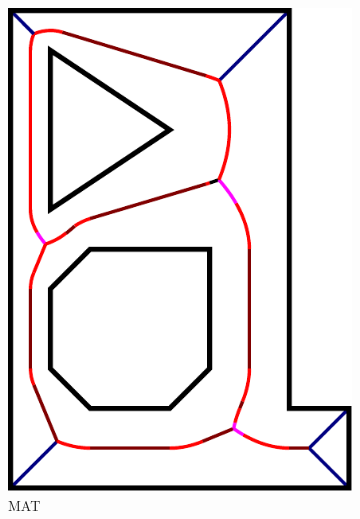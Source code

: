 \begin{figure}
\begin{subfigure}{0.3\columnwidth}
\includegraphics[width=\columnwidth]{sources/method/MAT_example.pdf}
\caption{MAT}
\end{subfigure}
\begin{subfigure}{0.3\columnwidth}

\end{subfigure}
\end{figure}
